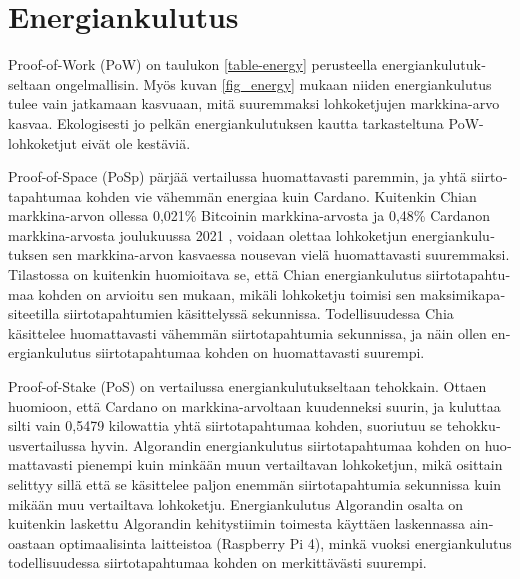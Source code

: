 \section{Energiankulutus\label{energiankulutus}}
\begin{otherlanguage}{english}

Proof-of-Work (PoW) on taulukon \ref{table-energy} perusteella energiankulutukseltaan ongelmallisin. Myös kuvan \ref{fig_energy} mukaan niiden energiankulutus tulee vain jatkamaan kasvuaan, mitä suuremmaksi lohkoketjujen markkina-arvo kasvaa. Ekologisesti jo pelkän energiankulutuksen kautta tarkasteltuna PoW-lohkoketjut eivät ole kestäviä.

Proof-of-Space (PoSp) pärjää vertailussa huomattavasti paremmin, ja yhtä siirtotapahtumaa kohden vie vähemmän energiaa kuin Cardano. Kuitenkin Chian markkina-arvon ollessa 0,021\% Bitcoinin markkina-arvosta ja 0,48\% Cardanon markkina-arvosta joulukuussa 2021 \cite{Coingecko}, voidaan olettaa lohkoketjun energiankulutuksen sen markkina-arvon kasvaessa nousevan vielä huomattavasti suuremmaksi. Tilastossa on kuitenkin huomioitava se, että Chian energiankulutus siirtotapahtumaa kohden on arvioitu sen mukaan, mikäli lohkoketju toimisi sen maksimikapasiteetilla siirtotapahtumien käsittelyssä sekunnissa. Todellisuudessa Chia käsittelee huomattavasti vähemmän siirtotapahtumia sekunnissa, ja näin ollen energiankulutus siirtotapahtumaa kohden on huomattavasti suurempi.

Proof-of-Stake (PoS) on vertailussa energiankulutukseltaan tehokkain. Ottaen huomioon, että Cardano on markkina-arvoltaan kuudenneksi suurin, ja kuluttaa silti vain 0,5479 kilowattia yhtä siirtotapahtumaa kohden, suoriutuu se tehokkuusvertailussa hyvin. Algorandin energiankulutus siirtotapahtumaa kohden on huomattavasti pienempi kuin minkään muun vertailtavan lohkoketjun, mikä osittain selittyy sillä että se käsittelee paljon enemmän siirtotapahtumia sekunnissa kuin mikään muu vertailtava lohkoketju. Energiankulutus Algorandin osalta on kuitenkin laskettu Algorandin kehitystiimin toimesta käyttäen laskennassa ainoastaan optimaalisinta laitteistoa (Raspberry Pi 4), minkä vuoksi energiankulutus todellisuudessa siirtotapahtumaa kohden on merkittävästi suurempi.

\end{otherlanguage}
